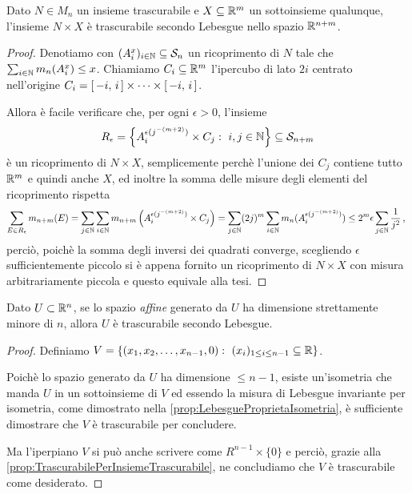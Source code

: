 \begin{proposition}\label{prop:TrascurabilePerInsiemeTrascurabile}
	Dato $N\in M_n$ un insieme trascurabile e $X\subseteq \mathbb R^m$ un sottoinsieme qualunque, l'insieme $N\times X$ è trascurabile secondo Lebesgue nello spazio $\mathbb R^{n+m}$.
\end{proposition}
\begin{proof}
	Denotiamo con $(A^{x}_i)_{i\in\mathbb N}\subseteq \mathcal S_n$ un ricoprimento di $N$ tale che $\sum_{i\in\mathbb N}m_n(A^x_i)\le x$.
	Chiamiamo $C_i\subseteq\mathbb R^m$ l'ipercubo di lato $2i$ centrato nell'origine $C_i=\left[\,-i,\,i\,\right]\times\cdots\times\left[\,-i,\,i\,\right]$.
	
	Allora è facile verificare che, per ogni $\epsilon>0$, l'insieme
	\begin{equation*}
		R_\epsilon=\left\{A^{\epsilon(j^{-(m+2)})}_i\times C_j:\ i,j\in\mathbb N\right\}\subseteq \mathcal S_{n+m}
	\end{equation*}
	è un ricoprimento di $N\times X$, semplicemente perchè l'unione dei $C_j$ contiene tutto $\mathbb R^m$ e quindi anche $X$, ed inoltre la somma delle misure degli elementi del ricoprimento rispetta
	\begin{equation*}
		\sum_{E\in R_\epsilon}m_{n+m}(E)=\sum_{j\in\mathbb N}\sum_{i\in\mathbb N}m_{n+m}\left(A^{\epsilon(j^{-(m+2)})}_i\times C_j\right)
		=\sum_{j\in\mathbb N}(2j)^m\sum_{i\in\mathbb N}m_n(A^{\epsilon(j^{-(m+2)})}_i)\le 2^m\epsilon\sum_{j\in\mathbb N}\frac1{j^2}\, \text{, }
	\end{equation*}
	perciò, poichè la somma degli inversi dei quadrati converge, scegliendo $\epsilon$ sufficientemente piccolo si è appena fornito un ricoprimento di $N\times X$ con misura arbitrariamente piccola e questo equivale alla tesi.
\end{proof}


\begin{proposition}\label{prop:SottospaziTrascurabili}
	Dato $U\subset\mathbb R^n$, se lo spazio \emph{affine} generato da $U$ ha dimensione strettamente minore di $n$, allora $U$ è trascurabile secondo Lebesgue.
\end{proposition}
\begin{proof}
	Definiamo $V=\{(x_1,x_2,\dots,x_{n-1},0):\ (x_i)_{1\le i\le n-1}\subseteq\mathbb R\}$.
	
	Poichè lo spazio generato da $U$ ha dimensione $\le n-1$, esiste un'isometria che manda $U$ in un sottoinsieme di $V$ ed essendo la misura di Lebesgue invariante per isometria, come dimostrato nella \cref{prop:LebesgueProprietaIsometria}, è sufficiente dimostrare che $V$ è trascurabile per concludere.
	
	Ma l'iperpiano $V$ si può anche scrivere come $R^{n-1}\times \{0\}$ e perciò, grazie alla \cref{prop:TrascurabilePerInsiemeTrascurabile}, ne concludiamo che $V$ è trascurabile come desiderato.
\end{proof}

